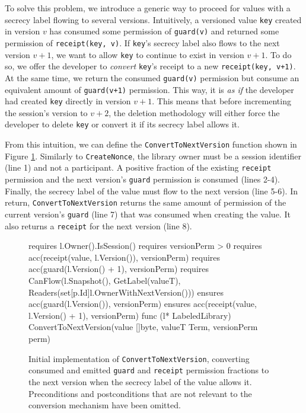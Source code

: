 To solve this problem, we introduce a generic way to proceed for values with a secrecy label flowing to several versions.
Intuitively, a versioned value \texttt{key} created in version $v$ has consumed some permission of \texttt{guard(v)} and returned some permission of \texttt{receipt(key, v)}.
If \texttt{key}'s secrecy label also flows to the next version $v+1$, we want to allow \texttt{key} to continue to exist in version $v+1$.
To do so, we offer the developer to \emph{convert} \texttt{key}'s receipt to a new \texttt{receipt(key, v+1)}. At the same time, we return the consumed \texttt{guard(v)} permission but consume an equivalent amount of \texttt{guard(v+1)} permission.
This way, it is \emph{as if} the developer had created \texttt{key} directly in version $v+1$.
This means that before incrementing the session's version to $v+2$, the deletion methodology will either force the developer to delete \texttt{key} or convert it if its secrecy label allows it.

From this intuition, we can define the \texttt{ConvertToNextVersion} function shown in Figure \ref{lst:convert-to-next-version}.
Similarly to \texttt{CreateNonce}, the library owner must be a session identifier (line 1) and not a participant. A positive fraction of the existing \texttt{receipt} permission and the next version's \texttt{guard} permission is consumed (lines 2-4). Finally, the secrecy label of the value must flow to the next version (line 5-6).
In return, \texttt{ConvertToNextVersion} returns the same amount of permission of the current version's \texttt{guard} (line 7) that was consumed when creating the value. It also returns a \texttt{receipt} for the next version (line 8).

\begin{figure}
    \begin{gobra}
requires l.Owner().IsSession()
requires versionPerm > 0
requires acc(receipt(value, l.Version()), versionPerm)
requires acc(guard(l.Version() + 1), versionPerm)
requires CanFlow(l.Snapshot(), GetLabel(valueT),
                        Readers(set[p.Id]{l.OwnerWithNextVersion()}))
ensures  acc(guard(l.Version()), versionPerm)
ensures  acc(receipt(value, l.Version() + 1), versionPerm)
func (l* LabeledLibrary) ConvertToNextVersion(value []byte,
                                       valueT Term, versionPerm perm)
    \end{gobra}
    \caption{Initial implementation of \texttt{ConvertToNextVersion}, converting consumed and emitted \texttt{guard} and \texttt{receipt} permission fractions to the next version when the secrecy label of the value allows it. Preconditions and postconditions that are not relevant to the conversion mechanism have been omitted.}
    \label{lst:convert-to-next-version}
\end{figure}

